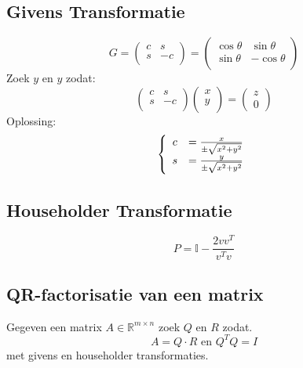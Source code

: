 \documentclass[samenvatting.tex]{subfiles}
\begin{document}
\subsection{Givens Transformatie}
\[
G = 
\begin{pmatrix}
c & s\\
s & -c\\
\end{pmatrix}
=
\begin{pmatrix}
\cos\theta & \sin\theta\\
\sin\theta & -\cos\theta\\
\end{pmatrix}
\]
Zoek $y$ en $y$ zodat:
\[
\begin{pmatrix}
c & s\\
s & -c\\
\end{pmatrix}
\begin{pmatrix}
x\\y\\
\end{pmatrix}
=
\begin{pmatrix}
z\\0
\end{pmatrix}
\]
Oplossing:
\[
\left\{
\begin{array}{c c}
c &= \frac{x}{\pm \sqrt{x^2+y^2}}\\
s &= \frac{y}{\pm \sqrt{x^2+y^2}}\\
\end{array}
\right.
\]

\subsection{Householder Transformatie}
\[
P =\mathbb{I} - \frac{2vv^T}{v^Tv}
\]

\subsection{QR-factorisatie van een matrix}
Gegeven een matrix $A\in \mathbb{R}^{m\times n}$ zoek $Q$ en $R$ zodat.
\[
A = Q \cdot R \text{ en } Q^{T}Q = I
\]
met givens en householder transformaties.
\end{document}
